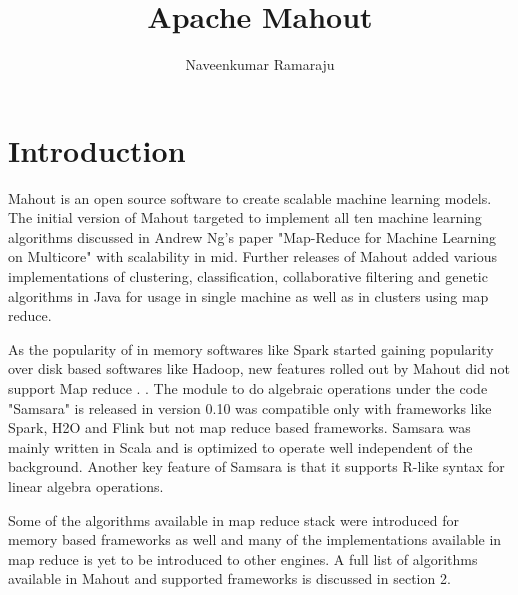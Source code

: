 \documentclass[9pt,twocolumn,twoside]{../../styles/osajnl}
\title{Apache Mahout}
\author[1,*]{Naveenkumar Ramaraju}
\affil[1]{School of Informatics and Computing, Bloomington, IN 47408, U.S.A.}
\affil[*]{Corresponding authors:naveenkumar2703@gmail.com}
\begin{document}
\maketitle
{}

\section{Introduction}
Mahout is an open source software to create scalable machine learning
models. The initial version of Mahout targeted to implement all ten
machine learning algorithms discussed in Andrew Ng's paper "Map-Reduce
for Machine Learning on Multicore"\cite{paper-NIPS2006_3150} with
scalability in mid. Further releases of Mahout added various
implementations of clustering, classification, collaborative filtering
and genetic algorithms in Java for usage in single machine as well as
in clusters using map reduce.

As the popularity of in memory softwares like Spark started gaining
popularity over disk based softwares like Hadoop, new features rolled
out by Mahout did not support Map reduce \TE.
.
The module to do algebraic
operations under the code "Samsara" is released in version 0.10 was
compatible only with frameworks like Spark, H2O and Flink but not map
reduce \TE based frameworks. Samsara was mainly written in Scala and is
optimized to operate well independent of the background. Another key
feature of Samsara is that it supports R-like syntax for linear
algebra operations.

Some of the algorithms available in map reduce \TE stack were introduced
for memory based frameworks as well and many of the implementations
available in map reduce \TE is yet to be introduced to other engines. A
full list of algorithms available in Mahout and supported frameworks
is discussed in section 2.
\end{document}
